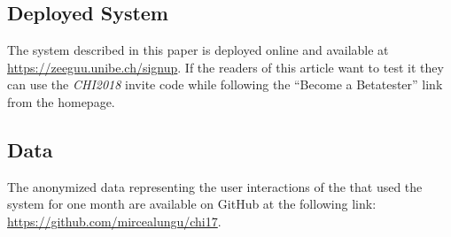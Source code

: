\subsection{Deployed System}
The system described in this paper is deployed online and available at \url{https://zeeguu.unibe.ch/signup}. If the readers of this article want to test it they can use the {\em CHI2018} invite code while following the  ``Become a Betatester'' link from the homepage.

\subsection{Data}
The anonymized data representing the user interactions of the \students that used the system for one month are available on GitHub at the following link: \url{https://github.com/mircealungu/chi17}.


